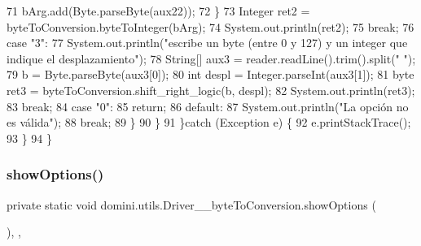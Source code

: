 \begin{DoxyCode}
71                         bArg.add(Byte.parseByte(aux22));
72                     \}
73                     Integer ret2 = byteToConversion.byteToInteger(bArg);
74                     System.out.println(ret2);
75                 \textcolor{keywordflow}{break};
76                 \textcolor{keywordflow}{case} \textcolor{stringliteral}{"3"}:
77                     System.out.println(\textcolor{stringliteral}{"escribe un byte (entre 0 y 127) y un integer que indique el
       desplazamiento"});
78                     String[] aux3 = reader.readLine().trim().split(\textcolor{stringliteral}{" "});
79                     b = Byte.parseByte(aux3[0]);
80                     \textcolor{keywordtype}{int} despl = Integer.parseInt(aux3[1]);
81                     byte ret3 = byteToConversion.shift\_right\_logic(b, despl);
82                     System.out.println(ret3);
83                 \textcolor{keywordflow}{break};
84                 \textcolor{keywordflow}{case} \textcolor{stringliteral}{"0"}:
85                     \textcolor{keywordflow}{return};
86                 \textcolor{keywordflow}{default}:
87                     System.out.println(\textcolor{stringliteral}{"La opción no es válida"});
88                 \textcolor{keywordflow}{break};
89             \}
90         \}
91     \}\textcolor{keywordflow}{catch} (Exception e) \{
92         e.printStackTrace();
93     \}
94     \}
\end{DoxyCode}
\mbox{\label{classdomini_1_1utils_1_1Driver____byteToConversion_a58412c0a63cc729003ca6d28bbc3b83b}} 
\subsubsection{\texorpdfstring{show\+Options()}{showOptions()}}
{\footnotesize\ttfamily private static void domini.\+utils.\+Driver\+\_\+\+\_\+byte\+To\+Conversion.\+show\+Options (\begin{DoxyParamCaption}{ }\end{DoxyParamCaption})\hspace{0.3cm}{\ttfamily [inline]}, {\ttfamily [static]}, {\ttfamily [private]}}




